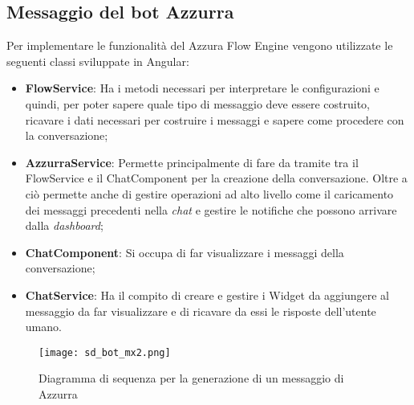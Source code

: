 \subsection{Messaggio del bot Azzurra}
Per implementare le funzionalità del Azzura Flow Engine vengono utilizzate le seguenti classi sviluppate in Angular:
\begin{itemize}
	\item \textbf{FlowService}: Ha i metodi necessari per interpretare le configurazioni  e quindi, per poter sapere quale tipo di messaggio deve essere costruito, ricavare i dati necessari per costruire i messaggi e sapere come procedere con la conversazione;
	\item \textbf{AzzurraService}: Permette principalmente di fare da tramite tra il FlowService e il ChatComponent per la creazione della conversazione. Oltre a ciò permette anche di gestire operazioni ad alto livello come il caricamento dei messaggi precedenti nella \emph{chat} e gestire le notifiche che possono arrivare dalla \emph{dashboard};
	\item \textbf{ChatComponent}: Si occupa di far visualizzare i messaggi della conversazione;
	\item \textbf{ChatService}: Ha il compito di creare e gestire i Widget da aggiungere al messaggio da far visualizzare e di ricavare da essi le risposte dell'utente umano.
\end{itemize}

\begin{figure}[htbp]
	\centering
	\texttt{[image: sd\_bot\_mx2.png]}
	\caption{Diagramma di sequenza per la generazione di un messaggio di Azzurra}\label{fig:mxBot}
\end{figure}


